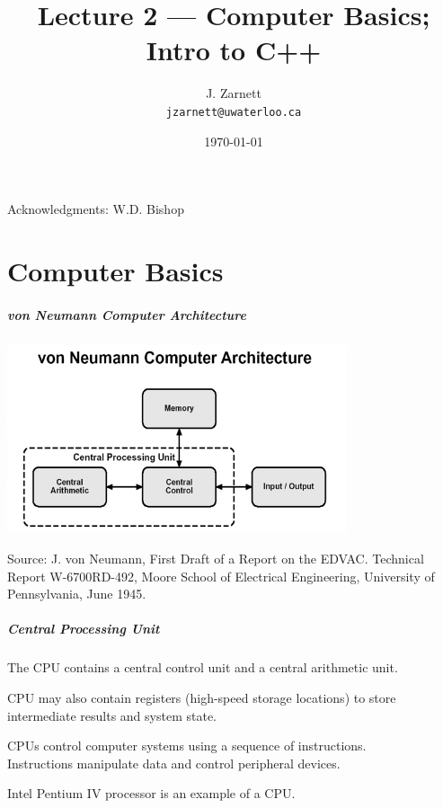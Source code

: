

\title{Lecture 2 --- Computer Basics; Intro to C++}

\author{J. Zarnett\\
\texttt{jzarnett@uwaterloo.ca}}
\date{\today}



\begin{frame}
  \titlepage
  
  \begin{center}
  \small{Acknowledgments: W.D. Bishop}
  \end{center}
 \end{frame}
 
\part{Computer Basics}
\begin{frame}\partpage\end{frame}

\begin{frame}
\frametitle{von Neumann Computer Architecture}

\begin{center}
\includegraphics[width=0.75\textwidth]{images/vonNeumann.png}
\end{center}

\tiny{Source: J. von Neumann, First Draft of a Report on the EDVAC.  Technical Report W-6700RD-492, Moore School of Electrical Engineering, University of Pennsylvania, June 1945.}

\end{frame}

\begin{frame}
\frametitle{Central Processing Unit}

The CPU contains a central control unit and a central arithmetic unit.

CPU may also contain registers (high-speed storage locations) to store intermediate results and system state.

CPUs control computer systems using a sequence of instructions.\\
\quad Instructions manipulate data and control peripheral devices.

Intel Pentium IV processor is an example of a CPU.

\end{frame}

